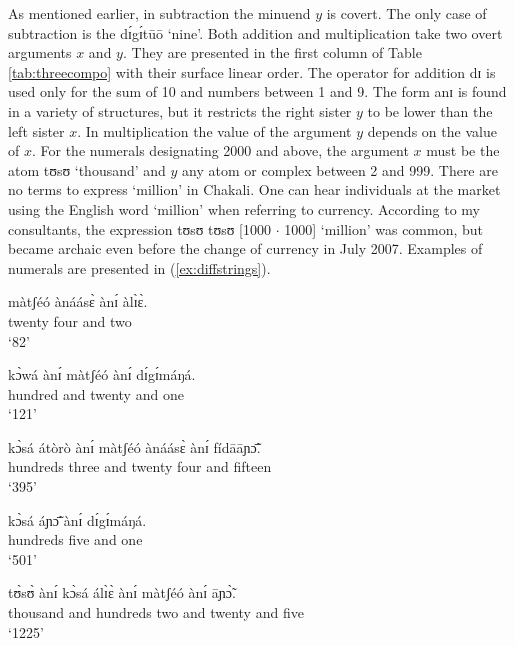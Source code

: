 \begin{exe}
\begin{exe}
\begin{exe}
\begin{exe}
\begin{exe}
\begin{exe}
\begin{exe}
\begin{exe}
\begin{exe}
\begin{exe}
As  mentioned earlier, in subtraction  the minuend $y$ is covert. The only case of subtraction is the  {\sls   dɪ́gɪ́tūō} `nine'.  Both addition  and multiplication take two overt arguments  $x$ and $y$. They are presented in the first column  of Table \ref{tab:threecompo} with their surface linear order. The operator for addition {\sls dɪ} is used only  for the sum of 10 and numbers between 1 and 9. The form {\sls anɪ} is found in a variety of structures, but it restricts the right sister $y$ to be lower than the left sister $x$. In multiplication  the value of the argument $y$ depends on the value of $x$. For the numerals designating  2000 and above, the argument $x$ must be the atom {\sls tʊsʊ} `thousand' and $y$  any atom or complex  between 2 and 999. There are no terms to express  `million' in Chakali. One can hear individuals at the market  using the English word `million' when referring to  currency. According to my consultants,  the expression {\sls  tʊsʊ tʊsʊ} [1000 $\cdot$ 1000] `million' was common, but became archaic even before the change of currency  in July 2007. Examples of numerals are presented in (\ref{ex:diffstrings}).

   

\ea\label{ex:diffstrings}
  \ea\label{ex:82}
\gll  màtʃéó  ànáásɛ̀ ànɪ́  àlɪ̀ɛ̀.\\
   {twenty} {four} {and} {two}\\
\glt `82'

\ex\label{ex:121}
\gll  kɔ̀wá  ànɪ́  màtʃéó  ànɪ́   dɪ́gɪ́máŋá.\\
    {hundred}  {and}  {twenty}  {and} {one}\\
\glt `121'
% 

\ex\label{ex:395}
\gll kɔ̀sá átòrò ànɪ́ màtʃéó ànáásɛ̀ ànɪ́  fídāāɲɔ̃̄.\\
 {hundreds} {three}  {and} {twenty}  {four} {and}  {fifteen}\\
\glt `395'

\ex\label{ex:501}
\gll kɔ̀sá  áɲɔ̃̄ ànɪ́  dɪ́gɪ́máŋá.\\
    {hundreds} {five}  {and}  {one}\\
\glt `501'

\ex\label{ex:1225}
\gll tʊ̀sʊ̀  ànɪ́   kɔ̀sá  álɪ̀ɛ̀   ànɪ́  màtʃéó  ànɪ́  āɲɔ̃̀.\\
    {thousand}  {and}  {hundreds}  {two}  {and}  {twenty}  {and} {five}\\
\glt `1225'


\end{exe}
\end{exe}
\end{exe}
\end{exe}
\end{exe}
\end{exe}
\end{exe}
\end{exe}
\end{exe}
\end{exe}
